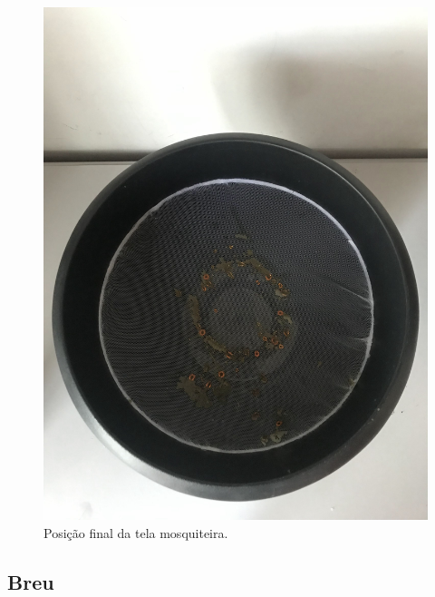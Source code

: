 \documentclass[
	12pt,				%
	openright,			%
	oneside,			%
	a4paper,			%
	chapter=TITLE,		%
	english,			%
	brazil				%
	]{abntex2}
\begin{document}
\begin{multicols}{2}
\begin{figure}[H]
    \includegraphics[scale=0.04, angle=-90]{imagens/IMG_0610.jpg}
    \caption{Posição final da tela mosquiteira.}
    \label{fig:mosquiteirarecorte}
\end{figure}
\end{multicols}

\subsection{Breu}
\end{document}
